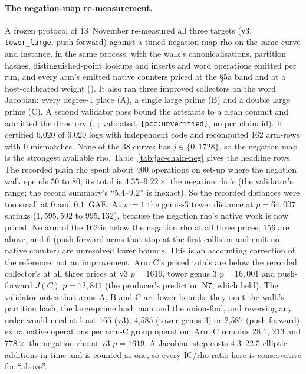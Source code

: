 \paragraph{The negation-map re-measurement.} A frozen protocol of
13~November re-measured all three targets (v3, \texttt{tower\_large},
push-forward) against a tuned negation-map rho on the same curve and
instance, in the same process, with the walk's canonicalisations, partition
hashes, distinguished-point lookups and inserts and word operations
emitted per run, and every arm's emitted native counters priced at the
\S5a band and at a host-calibrated weight
(). It also ran three
improved collectors on the word Jacobian: every degree-1 place (A), a single
large prime (B) and a double large prime (C). A second validator pass bound
the artefacts to a clean commit and admitted the directory
(,
; validated,
\texttt{[pcc:unverified]}, no pcc claim id). It certified 6{,}020 of 6{,}020
logs with independent code and recomputed 162 arm-rows with 0 mismatches.
None of the 38 curves has $j\in\{0,1728\}$, so the negation map is the
strongest available rho. Table~\ref{tab:jac-chain-neg} gives the headline
rows. The recorded plain rho spent about 400 operations on set-up where the
negation walk spends 50 to 80; its total is $4.35$--$9.22\times$ the negation
rho's (the validator's range; the record summary's ``5.4--9.2'' is
inexact). So the recorded distances were too small at 0 and $0.1$~GAE. At
$w=1$ the genus-3 tower distance at $p=64{,}007$ shrinks ($1{,}595{,}592$ to
$995{,}132$), because the negation rho's native work is now priced. No arm
of the 162 is below the negation rho at all three prices; 156 are above, and
6 (push-forward arms that stop at the first collision and emit no native
counter) are unresolved lower bounds. This is an accounting correction of
the reference, not an improvement. Arm C's priced totals are below the
recorded collector's at all three prices at v3 $p=1619$, tower genus 3
$p=16{,}001$ and push-forward $J(C)$ $p=12{,}841$ (the producer's prediction
N7, which held). The validator notes that arms A, B and C are lower bounds:
they omit the walk's partition hash, the large-prime hash map and the
union-find, and reversing any order would need at least 165 (v3), 4{,}585
(tower genus 3) or 2{,}587 (push-forward) extra native operations per
arm-C group operation. Arm C remains $28.1$, 213 and $778\times$ the negation
rho at v3 $p=1619$. A Jacobian step costs $4.3$--$22.5$ elliptic additions in
time and is counted as one, so every IC/rho ratio here is conservative for
``above''.

